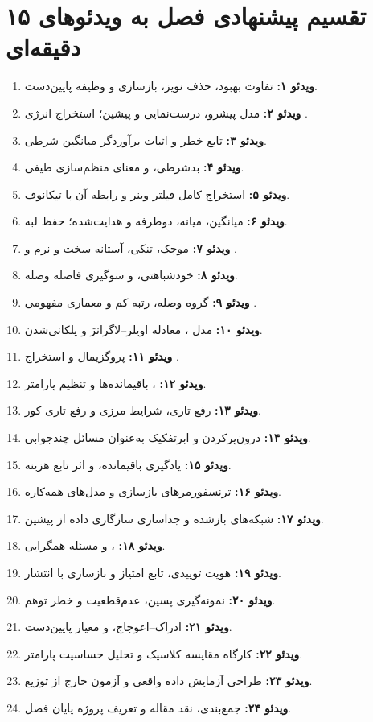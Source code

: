 \documentclass[12pt,openany,oneside]{book}
\begin{document}
\section{تقسیم پیشنهادی فصل به ویدئوهای ۱۵ دقیقه‌ای}

\begin{videobox}
\begin{enumerate}
\item \textbf{ویدئو ۱:} تفاوت بهبود، حذف نویز، بازسازی و وظیفه پایین‌دست.
\item \textbf{ویدئو ۲:} مدل پیشرو، درست‌نمایی و پیشین؛ استخراج انرژی .
\item \textbf{ویدئو ۳:} تابع خطر و اثبات برآوردگر میانگین شرطی.
\item \textbf{ویدئو ۴:} بدشرطی،  و معنای منظم‌سازی طیفی.
\item \textbf{ویدئو ۵:} استخراج کامل فیلتر وینر و رابطه آن با تیکانوف.
\item \textbf{ویدئو ۶:} میانگین، میانه، دوطرفه و هدایت‌شده؛ حفظ لبه.
\item \textbf{ویدئو ۷:} موجک، تنکی، آستانه سخت و نرم و .
\item \textbf{ویدئو ۸:} خودشباهتی،  و سوگیری فاصله وصله.
\item \textbf{ویدئو ۹:} گروه وصله، رتبه کم و معماری مفهومی .
\item \textbf{ویدئو ۱۰:} مدل ، معادله اویلر--لاگرانژ و پلکانی‌شدن.
\item \textbf{ویدئو ۱۱:} پروگزیمال و استخراج .
\item \textbf{ویدئو ۱۲:} ، باقیمانده‌ها و تنظیم پارامتر.
\item \textbf{ویدئو ۱۳:} رفع تاری، شرایط مرزی و رفع تاری کور.
\item \textbf{ویدئو ۱۴:} درون‌پرکردن و ابرتفکیک به‌عنوان مسائل چندجوابی.
\item \textbf{ویدئو ۱۵:} یادگیری باقیمانده،  و اثر تابع هزینه.
\item \textbf{ویدئو ۱۶:} ترنسفورمرهای بازسازی و مدل‌های همه‌کاره.
\item \textbf{ویدئو ۱۷:} شبکه‌های بازشده و جداسازی سازگاری داده از پیشین.
\item \textbf{ویدئو ۱۸:} ،  و مسئله همگرایی.
\item \textbf{ویدئو ۱۹:} هویت توییدی، تابع امتیاز و بازسازی با انتشار.
\item \textbf{ویدئو ۲۰:} نمونه‌گیری پسین، عدم‌قطعیت و خطر توهم.
\item \textbf{ویدئو ۲۱:} ادراک--اعوجاج،  و معیار پایین‌دست.
\item \textbf{ویدئو ۲۲:} کارگاه مقایسه کلاسیک و تحلیل حساسیت پارامتر.
\item \textbf{ویدئو ۲۳:} طراحی آزمایش داده واقعی و آزمون خارج از توزیع.
\item \textbf{ویدئو ۲۴:} جمع‌بندی، نقد مقاله و تعریف پروژه پایان فصل.
\end{enumerate}
\end{videobox}
\end{document}
